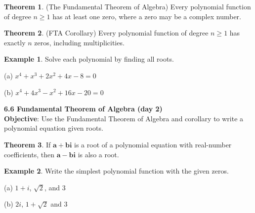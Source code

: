 \documentclass{report}
\theoremstyle{definition}
\newtheorem{example}{\bf Example}
\newtheorem{theorem}{\bf Theorem}[section]
\begin{document}
\vfill
\vfill

\begin{theorem}
(The Fundamental Theorem of Algebra) Every polynomial function of degree $n \geq 1$ has at least one zero, where a zero may be a complex number.
\end{theorem}

\begin{theorem}
(FTA Corollary) Every polynomial function of degree $n\geq 1$ has exactly $n$ zeros, including multiplicities.
\end{theorem}

\begin{example}
Solve each polynomial by finding all roots.
\end{example}

\begin{minipage}[t]{0.45\linewidth}
(a) $x^4+x^3+2x^2+4x-8 = 0$
\end{minipage}
\hfill
\begin{minipage}[t]{0.45\linewidth}
(b) $x^4+4x^3-x^2+16x-20 = 0$
\end{minipage}


\vfill
\vfill
 \noindent{}
 \newpage

\noindent\Large\textbf{6.6 Fundamental Theorem of Algebra (day 2)}\\
\noindent \hfill\small \noindent \textbf{Objective}: Use the Fundamental Theorem of Algebra and corollary to write a polynomial equation given roots. \normalsize\\

\begin{theorem}
If $\mathbf{a+bi}$ is a root of a polynomial equation with real-number coefficients, then $\mathbf{a-bi}$ is also a root.
\end{theorem}

\begin{example}
Write the simplest polynomial function with the given zeros.
\end{example}

\begin{minipage}[t]{0.45\linewidth}
(a)  $1+i$, $\sqrt{2}$, and $3$
\end{minipage}
\hfill
\begin{minipage}[t]{0.45\linewidth}
(b) $2i$, $1+\sqrt{2}$ and $3$
\end{minipage}
\end{document}
